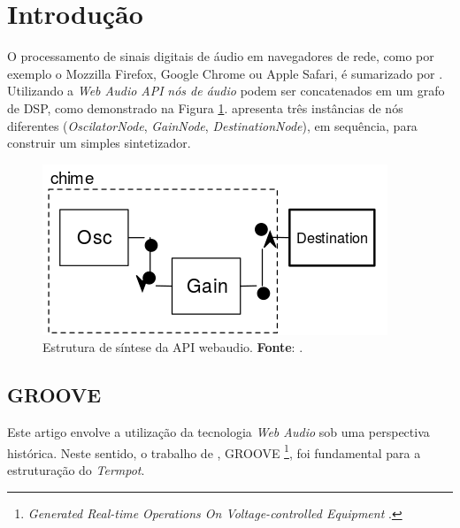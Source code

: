 \section{Introdução}\label{sec:introducao}




O processamento de sinais digitais de áudio em navegadores de rede, como por exemplo o Mozzilla Firefox, Google Chrome ou Apple Safari, é sumarizado por \cite{roberts_web_2013,wyse_viability_2014}. Utilizando a \emph{Web Audio API} \cite{w3c_web_2012} \emph{nós de áudio} podem ser concatenados em um grafo de DSP, como demonstrado na Figura \ref{fig:shime}. \cite{srikumar_tamming_2013} apresenta três instâncias de nós diferentes (\emph{OscilatorNode}, \emph{GainNode}, \emph{DestinationNode}), em sequência, para construir um simples sintetizador.

\begin{figure}[h]
\centering
\includegraphics[scale=0.35]{chime.png}
\caption{Estrutura de síntese da API webaudio. \textbf{Fonte}: \cite{srikumar_tamming_2013}.}
\label{fig:shime}
\end{figure}

\subsection{GROOVE}

Este artigo envolve a utilização da tecnologia \emph{Web Audio} sob uma perspectiva histórica. Neste sentido, o trabalho de \cite{mathews_groove_1970}, GROOVE \footnote{\emph{Generated Real-time Operations On Voltage-controlled Equipment} \cite{serra_sound_2008,reynolds_resident_2012}.}, foi fundamental para a estruturação do \emph{Termpot}. 

